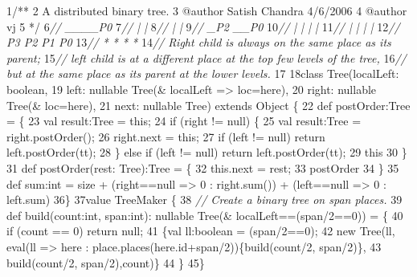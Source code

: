 \begin{tightcode}
\quad\num{1}/**
\quad\num{2}   A distributed binary tree.
\quad\num{3}   @author Satish Chandra 4/6/2006
\quad\num{4}   @author vj
\quad\num{5} */
\quad\num{6}\emph{//                             \_\_\_\_P0}
\quad\num{7}\emph{//                            |     |}
\quad\num{8}\emph{//                            |     |}
\quad\num{9}\emph{//                          \_P2  \_\_P0}
\quad\num{10}\emph{//                         |  | |   |}
\quad\num{11}\emph{//                         |  | |   |}
\quad\num{12}\emph{//                        P3 P2 P1 P0}
\quad\num{13}\emph{//                         *  *  *  *}
\quad\num{14}\emph{// Right child is always on the same place as its parent;}
\quad\num{15}\emph{// left child is at a different place at the top few levels of the tree,}
\quad\num{16}\emph{// but at the same place as its parent at the lower levels.}
\quad\num{17}
\quad\num{18}class Tree(localLeft: boolean,
\quad\num{19}           left: nullable Tree(& localLeft => loc=here),
\quad\num{20}           right: nullable Tree(& loc=here),
\quad\num{21}           next: nullable Tree) extends Object \{
\quad\num{22}    def postOrder:Tree = \{
\quad\num{23}        val result:Tree = this;
\quad\num{24}        if (right != null) \{
\quad\num{25}            val result:Tree = right.postOrder();
\quad\num{26}            right.next = this;
\quad\num{27}            if (left != null) return left.postOrder(tt);
\quad\num{28}        \} else if (left != null) return left.postOrder(tt);
\quad\num{29}        this
\quad\num{30}    \}
\quad\num{31}    def postOrder(rest: Tree):Tree = \{
\quad\num{32}        this.next = rest;
\quad\num{33}        postOrder
\quad\num{34}    \}
\quad\num{35}    def sum:int = size + (right==null => 0 : right.sum()) + (left==null => 0 : left.sum)
\quad\num{36}\}
\quad\num{37}value TreeMaker \{
\quad\num{38}    \emph{// Create a binary tree on span places.}
\quad\num{39}    def build(count:int, span:int): nullable Tree(& localLeft==(span/2==0)) = \{
\quad\num{40}        if (count == 0) return null;
\quad\num{41}        \{val ll:boolean = (span/2==0);
\quad\num{42}         new Tree(ll,  eval(ll => here : place.places(here.id+span/2))\{build(count/2, span/2)\},
\quad\num{43}           build(count/2, span/2),count)\}
\quad\num{44}    \}
\quad\num{45}\}
\end{tightcode}
